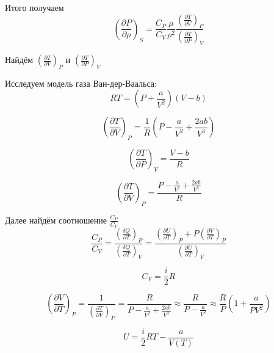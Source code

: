 \documentclass[a4paper,12pt]{article}
\begin{document}
Итого получаем
\begin{equation}
	\left ( \frac{\partial P}{\partial \rho}\right )_S = \frac{C_P}{C_V} \frac{\mu}{\rho^2}\frac{\left ( \frac{\partial T}{\partial V}\right )_P}{\left ( \frac{\partial T}{\partial P}\right )_V}
\end{equation}

Найдём $\left ( \frac{\partial T}{\partial V}\right )_P$ и $\left ( \frac{\partial T}{\partial P}\right )_V$

Исследуем модель газа Ван-дер-Ваальса:
\begin{equation}
	RT = \left(P + \frac{a}{V^2}\right)(V - b)
\end{equation}

\begin{equation}
	\left ( \frac{\partial T}{\partial V}\right )_P = \frac{1}{R} \left(P - \frac{a}{V^2} + \frac{2ab}{V^3}\right) 
\end{equation}

\begin{equation}
	\left ( \frac{\partial T}{\partial P}\right )_V = \frac{V - b}{R}
\end{equation}

\begin{equation}
	\left ( \frac{\partial T}{\partial V}\right )_P = \frac{P - \frac{a}{V^2} + \frac{2ab}{V^3}}{R}
\end{equation}

Далее найдём соотношение $\frac{C_P}{C_V}$
\begin{equation}
	\frac{C_P}{C_V} = \frac{\left ( \frac{\delta Q}{\partial T}\right )_P}{\left ( \frac{\delta Q}{\partial T}\right )_V} = \frac{\left ( \frac{\partial U}{\partial T}\right )_P + P\left ( \frac{\partial V}{\partial T}\right )_P}{\left ( \frac{\partial U}{\partial T}\right )_V}
\end{equation}

\begin{equation}
	C_V = \frac{i}{2}R
\end{equation}

\begin{equation}
	\left ( \frac{\partial V}{\partial T}\right )_P = \frac{1}{\left ( \frac{\partial T}{\partial V}\right )_P} = \frac{R}{P - \frac{a}{V^2} + \frac{2ab}{V^3}} \approx \frac{R}{P - \frac{a}{V^2}} \approx \frac{R}{P}\left(1 + \frac{a}{PV^2}\right)
\end{equation}

\begin{equation}
	U = \frac{i}{2}RT - \frac{a}{V(T)}
\end{equation}
\end{document}
